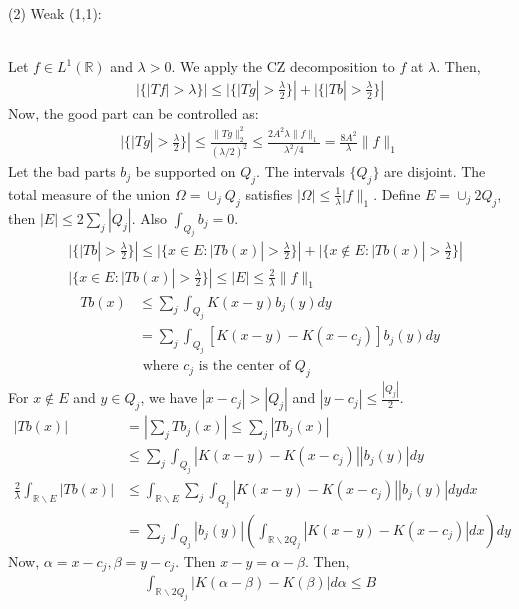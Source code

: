 \documentclass{article}
\newcommand{\R}{\mathbb{R}}
\begin{document}
(2) Weak (1,1):
\\~

Let $f \in L^1(\R)$ and $\lambda > 0$. We apply the CZ decomposition to $f$ at $\lambda$. Then,
\begin{align*}
    |\{|Tf| > \lambda\}| \leq |\{|Tg| > \frac{\lambda}{2}\}| + |\{|Tb| > \frac{\lambda}{2}\}|
\end{align*}
Now, the good part can be controlled as:
\begin{align*}
    |\{|Tg| > \frac{\lambda}{2}\}| \leq \frac{\lVert Tg \rVert_2^2}{(\lambda/2)^2} \leq \frac{2A^2 \lambda \lVert f \rVert_1}{\lambda^2/4} = \frac{8A^2}{\lambda} \lVert f \rVert_1
\end{align*}
Let the bad parts $b_j$ be supported on $Q_j$. The intervals $\{Q_j\}$ are disjoint. The total measure of the union $\Omega = \cup_j Q_j$ satisfies $|\Omega| \leq \frac{1}{\lambda} \lvert f \rVert_1$. Define $E = \cup_j 2Q_j$, then $|E| \leq 2\sum_j |Q_j|$. Also $\int_{Q_j} b_j = 0$.
\begin{align*}
    &|\{|Tb| > \frac{\lambda}{2}\}| \leq |\{x\in E: |Tb(x)| > \frac{\lambda}{2}\}| + |\{x\notin E: |Tb(x)| > \frac{\lambda}{2}\}| \\
    &|\{x\in E: |Tb(x)| > \frac{\lambda}{2}\}| \leq |E| \leq \frac{2}{\lambda} \lVert f \rVert_1
\end{align*}
\begin{align*}
    Tb(x) &\leq \sum_j \int_{Q_j} K(x-y)b_j(y)dy \\
    &= \sum_j \int_{Q_j} [K(x-y) - K(x-c_j)]b_j(y)dy\\
    &\text{ where } c_j \text{ is the center of } Q_j
\end{align*}
For $x \notin E$ and $y \in Q_j$, we have $|x-c_j| > |Q_j|$ and $|y-c_j| \leq \frac{|Q_j|}{2}$.
\begin{align*}
    |Tb(x)| &= |\sum_j Tb_j(x)| \leq \sum_j|Tb_j(x)| \\
    &\leq \sum_j \int_{Q_j} |K(x-y) - K(x-c_j)||b_j(y)|dy \\
    \frac{2}{\lambda} \int_{\R\backslash E} |Tb(x)| &\leq \int_{\R \backslash E} \sum_j \int_{Q_j} |K(x-y) - K(x-c_j)||b_j(y)|dydx \\
    &= \sum_j  \int_{Q_j} |b_j(y)| \left( \int_{\R \backslash 2Q_j}  |K(x-y) - K(x-c_j)| dx \right) dy
\end{align*}
Now, $\alpha = x-c_j, \beta=y-c_j$. Then $x-y = \alpha - \beta$. Then,
\begin{align*}
    \int_{\R \backslash 2Q_j} |K(\alpha - \beta) - K(\beta)| d\alpha \leq B
\end{align*}
\end{document}
